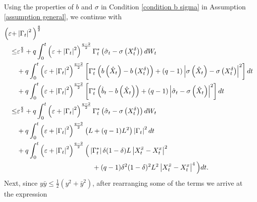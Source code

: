 \documentclass[11pt]{amsart}
\theoremstyle{plain}
\def \dd{{\rm d}}
\numberwithin{equation}{section}
\begin{document}
Using the properties of $b$ and $\sigma$ in Condition \ref{condition b sigma} in Assumption \ref{assumption general}, we continue with
$$
\begin{aligned}
 \Big( \varepsilon+&\left|\Gamma_{t}\right|^{2}\Big)^{\frac{q}{2}}  \\
 \leq& 
 \varepsilon^{\frac q2} +q \int_{0}^{t}\left(\varepsilon+\left|\Gamma_{t}\right|^2 \right)^{\frac{q-2}{2}} \Gamma_{t}^{*}\left(\hat{\sigma}_{t}-\sigma\left(X_{t}^{\delta}\right)\right) \dd W_{t} \\
& +q \int_{0}^{t}\left(\varepsilon+\left|\Gamma_{t}\right|^{2}\right)^{\frac{q-2}{2}}\left[\Gamma_{t}^{*}\left(b\left(\hat{X}_{t}\right)-b\left(X_{t}^{\delta}\right)\right)+(q-1)\left|\sigma\left(\hat{X}_{t}\right)-\sigma\left(X_{t}^{\delta}\right)\right|^{2}\right] \dd t \\
& +q  \int_{0}^{t}\left(\varepsilon+\left|\Gamma_{t}\right|^{2}\right)^{\frac{q-2}{2}}\left[\Gamma_{t}^{*}\left(\hat{b}_{t}-b\left(\hat{X}_{t}\right)\right)+(q-1)\left|\hat{\sigma}_{t}-\sigma\left(\hat{X}_{t}\right)\right|^{2}\right] \dd t  \\
\leq& \varepsilon^{\frac{q}{2}} +q \int_{0}^{t}\left(\varepsilon+\left|\Gamma_{t}\right|^2 \right)^{\frac{q-2}{2}} \Gamma_{t}^{*}\left(\hat{\sigma}_{t}-\sigma\left(X_{t}^{\delta}\right)\right) \dd W_{t} \\
& +q  \int_{0}^{t}\left(\varepsilon+\left|\Gamma_{t}\right|^{2}\right)^{\frac{q-2}{2}}\left(L+(q-1) L^{2}\right)\left|\Gamma_{t}\right|^{2} \dd t \\
& +q  \int_{0}^{t}\left(\varepsilon+\left|\Gamma_{t}\right|^{2}\right)^{\frac{q-2}{2}}\Big(\left|\Gamma_{t}^{*}\right| \delta(1-\delta) L\left|X_{t}^{\bar{x}}-X_{t}^{x}\right|^{2} \\
& \qquad \qquad \qquad \qquad \qquad \quad +(q-1) \delta^{2}(1-\delta)^{2} L^{2}\left|X_{t}^{\bar{x}}-X_{t}^{x}\right|^{4}\Big) \dd t  .
\end{aligned}
$$
Next, since $y \bar y \leq \frac12 (y^2 +\bar y^2)$, after rearranging some of the terms we arrive at the expression
\end{document}
